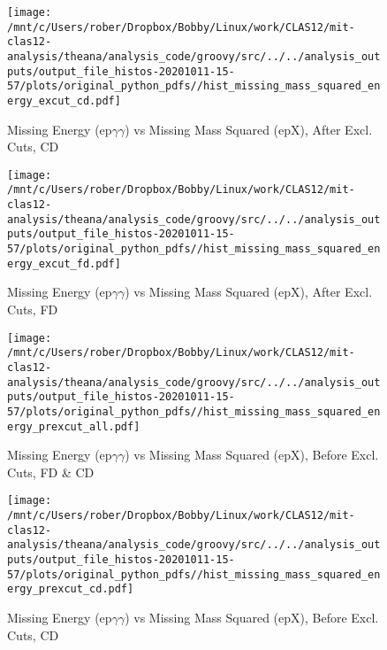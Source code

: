 \documentclass{article}
\begin{document}
\begin{landscape}
    \begin{figure}[h]
        \centering

        \texttt{[image: /mnt/c/Users/rober/Dropbox/Bobby/Linux/work/CLAS12/mit-clas12-analysis/theana/analysis\_code/groovy/src/../../analysis\_outputs/output\_file\_histos-20201011-15-57/plots/original\_python\_pdfs//hist\_missing\_mass\_squared\_energy\_excut\_cd.pdf]}
        \captionsetup{textformat=empty,labelformat=blank}
        \caption{Missing Energy (ep$\gamma$$\gamma$) vs Missing Mass Squared (epX), After Excl. Cuts, CD}
    \end{figure}
    \clearpage
    
    \begin{figure}[h]
        \centering

        \texttt{[image: /mnt/c/Users/rober/Dropbox/Bobby/Linux/work/CLAS12/mit-clas12-analysis/theana/analysis\_code/groovy/src/../../analysis\_outputs/output\_file\_histos-20201011-15-57/plots/original\_python\_pdfs//hist\_missing\_mass\_squared\_energy\_excut\_fd.pdf]}
        \captionsetup{textformat=empty,labelformat=blank}
        \caption{Missing Energy (ep$\gamma$$\gamma$) vs Missing Mass Squared (epX), After Excl. Cuts, FD}
    \end{figure}
    \clearpage
    
    \begin{figure}[h]
        \centering

        \texttt{[image: /mnt/c/Users/rober/Dropbox/Bobby/Linux/work/CLAS12/mit-clas12-analysis/theana/analysis\_code/groovy/src/../../analysis\_outputs/output\_file\_histos-20201011-15-57/plots/original\_python\_pdfs//hist\_missing\_mass\_squared\_energy\_prexcut\_all.pdf]}
        \captionsetup{textformat=empty,labelformat=blank}
        \caption{Missing Energy (ep$\gamma$$\gamma$) vs Missing Mass Squared (epX), Before Excl. Cuts, FD \& CD}
    \end{figure}
    \clearpage
    
    \begin{figure}[h]
        \centering

        \texttt{[image: /mnt/c/Users/rober/Dropbox/Bobby/Linux/work/CLAS12/mit-clas12-analysis/theana/analysis\_code/groovy/src/../../analysis\_outputs/output\_file\_histos-20201011-15-57/plots/original\_python\_pdfs//hist\_missing\_mass\_squared\_energy\_prexcut\_cd.pdf]}
        \captionsetup{textformat=empty,labelformat=blank}
        \caption{Missing Energy (ep$\gamma$$\gamma$) vs Missing Mass Squared (epX), Before Excl. Cuts, CD}
    \end{figure}
    \clearpage
    

\end{landscape}
\end{document}
